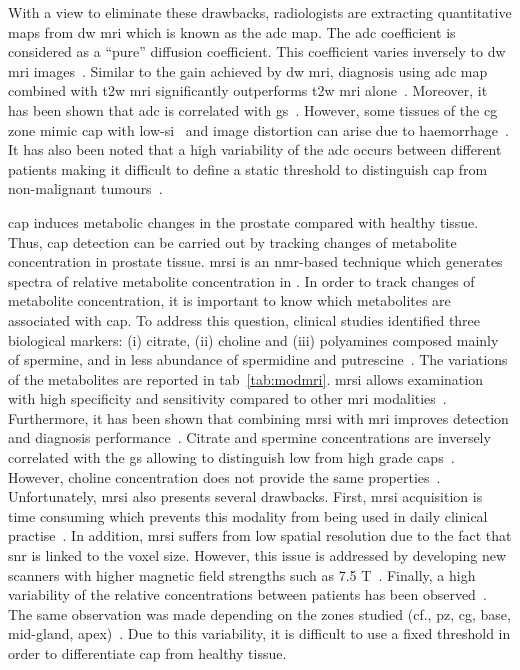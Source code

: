 With a view to eliminate these drawbacks, radiologists are extracting quantitative maps from \ac{dw} \ac{mri} which is known as the \ac{adc} map. The \ac{adc} coefficient is considered as a ``pure'' diffusion coefficient. This coefficient varies inversely to \ac{dw} \ac{mri} images~\cite{Barentsz2012}. %
Similar to the gain achieved by \ac{dw} \ac{mri}, diagnosis using \ac{adc} map combined with \ac{t2w} \ac{mri} significantly outperforms \ac{t2w} \ac{mri} alone~\cite{Doo2012,Choi2007}. Moreover, it has been shown that \ac{adc} is correlated with \ac{gs}~\cite{Hambrock2011, Itou2011, Peng2013}. However, some tissues of the \ac{cg} zone mimic \ac{cap} with low-\ac{si}~\cite{Kirkham2006} and image distortion can arise due to haemorrhage~\cite{Choi2007}. It has also been noted that a high variability of the \ac{adc} occurs between different patients making it difficult to define a static threshold to distinguish \ac{cap} from non-malignant tumours~\cite{Choi2007}.

\ac{cap} induces metabolic changes in the prostate compared with healthy tissue. Thus, \ac{cap} detection can be carried out by tracking changes of metabolite concentration in prostate tissue. \ac{mrsi} is an \ac{nmr}-based technique which generates spectra of relative metabolite concentration in . In order to track changes of metabolite concentration, it is important to know which metabolites are associated with \ac{cap}. To address this question, clinical studies identified three biological markers: (i) citrate, (ii) choline and (iii) polyamines composed mainly of spermine, and in less abundance of spermidine and putrescine~\cite{Awwad2012,Costello2006,Giskeodegard2013}. The variations of the metabolites are reported in \ac{tab}~\ref{tab:modmri}. \ac{mrsi} allows examination with high specificity and sensitivity compared to other \ac{mri} modalities~\cite{Choi2007}. Furthermore, it has been shown that combining \ac{mrsi} with \ac{mri} improves detection and diagnosis performance~\cite{Scheidler1999a,Kaji1998,Vilanova2009}. Citrate and spermine concentrations are inversely correlated with the \ac{gs} allowing to distinguish low from high grade \acp{cap}~\cite{Giskeodegard2013}. However, choline concentration does not provide the same properties~\cite{Giskeodegard2013}. Unfortunately, \ac{mrsi} also presents several drawbacks. First, \ac{mrsi} acquisition is time consuming which prevents this modality from being used in daily clinical practise~\cite{Barentsz2012}. In addition, \ac{mrsi} suffers from low spatial resolution due to the fact that \ac{snr} is linked to the voxel size. However, this issue is addressed by developing new scanners with higher magnetic field strengths such as 7.5 T~\cite{Giskeodegard2013}. Finally, a high variability of the relative concentrations between patients has been observed~\cite{Choi2007}. The same observation was made depending on the zones studied (cf., \ac{pz}, \ac{cg}, base, mid-gland, apex)~\cite{Walker2010,Lemaitre2011}. Due to this variability, it is difficult to use a fixed threshold in order to differentiate \ac{cap} from healthy tissue.

